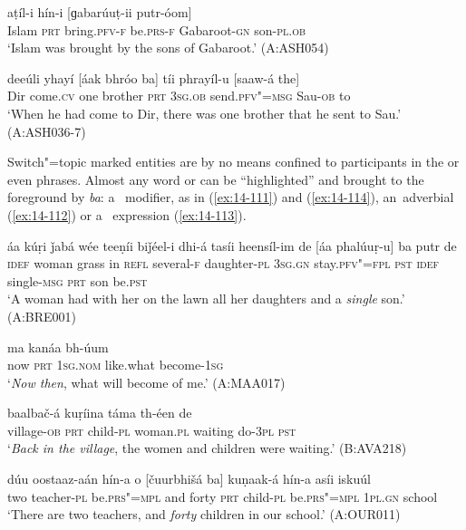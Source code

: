 \begin{exe}
\ex
\label{ex:14-109}
\gll [islaám ba] aṭíl-i hín-i [ɡabarúuṭ-ii putr-óom] \\
Islam \textsc{prt} bring.\textsc{pfv-f} be.\textsc{prs-f} Gabaroot-\textsc{gn} son-\textsc{pl.ob } \\
\glt `Islam was brought by the sons of Gabaroot.' (A:ASH054)

\ex
\label{ex:14-110}
\gll deeúli yhayí [áak bhróo ba] tíi phrayíl-u  [saaw-á the]  \\
Dir come.\textsc{cv} one brother \textsc{prt} \textsc{3sg.ob} send.\textsc{pfv"=msg}  Sau-\textsc{ob} to \\
\glt `When he had come to Dir, there was one brother that he sent to Sau.' (A:ASH036-7)
\end{exe}

Switch"=topic marked entities are by no means confined to participants in the  or even  phrases. Almost any word or  can be ``highlighted'' and brought to the foreground by \textit{ba}: a~ modifier, as in (\ref{ex:14-111}) and (\ref{ex:14-114}), an~adverbial (\ref{ex:14-112}) or a~ expression (\ref{ex:14-113}). 

\begin{exe}
\ex
\label{ex:14-111}
\gll áa kúṛi ǰabá wée teeṇíi biǰéel-i dhi-á  tasíi heensíl-im de
\textsc{[}áa phalúuṛ-u] ba  putr de \\
\textsc{idef} woman grass in \textsc{refl} several-\textsc{f } daughter-\textsc{pl}  \textsc{3sg.gn} stay.\textsc{pfv"=fpl} \textsc{pst} \textsc{idef} single-\textsc{msg} \textsc{prt} son be.\textsc{pst} \\
\glt `A woman had with her on the lawn all her daughters and a \textit{single} son.' (A:BRE001)

\ex
\label{ex:14-112}
\gll [típa ba] ma kanáa bh-úum \\
now \textsc{prt} \textsc{1sg.nom} like.what become-\textsc{1sg } \\
\glt `\textit{Now then}, what will become of me.' (A:MAA017)

\ex
\label{ex:14-113}
\gll [díiš-a ba] baalbač-á kuṛíina táma  th-éen de \\
village-\textsc{ob} \textsc{prt} child-\textsc{pl} woman.\textsc{pl} waiting do-\textsc{3pl} \textsc{pst } \\
\glt `\textit{Back in the village}, the women and children were waiting.' (B:AVA218)

\ex
\label{ex:14-114}
\gll dúu oostaaz-aán hín-a o [čuurbhišá  ba] kuṇaak-á hín-a asíi iskuúl \\
two teacher-\textsc{pl} be.\textsc{prs"=mpl} and forty  \textsc{prt} child-\textsc{pl} be.\textsc{prs"=mpl} \textsc{1pl.gn} school  \\
\glt `There are two teachers, and \textit{forty} children in our school.' (A:OUR011)
\end{exe}

